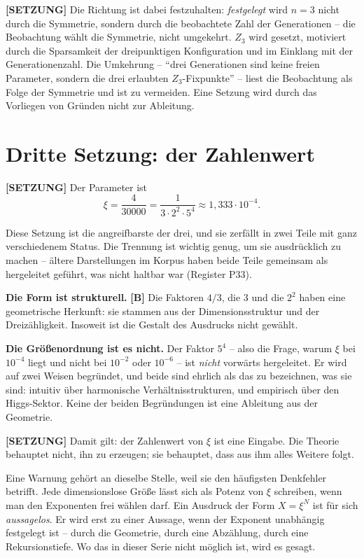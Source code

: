\textbf{[SETZUNG]} Die Richtung ist dabei festzuhalten: \emph{festgelegt} wird
$n=3$ nicht durch die Symmetrie, sondern durch die beobachtete Zahl der
Generationen -- die Beobachtung wählt die Symmetrie, nicht umgekehrt. $Z_3$ wird
gesetzt, motiviert durch die Sparsamkeit der dreipunktigen Konfiguration und im
Einklang mit der Generationenzahl. Die Umkehrung -- \enquote{drei Generationen
sind keine freien Parameter, sondern die drei erlaubten $Z_3$-Fixpunkte} -- liest
die Beobachtung als Folge der Symmetrie und ist zu vermeiden.
Eine Setzung wird durch das Vorliegen von Gründen nicht zur Ableitung.

\section{Dritte Setzung: der Zahlenwert}

\textbf{[SETZUNG]} Der Parameter ist
\[
  \xi = \frac{4}{30000} = \frac{1}{3\cdot 2^2\cdot 5^4}
  \approx 1{,}333\cdot 10^{-4}.
\]

Diese Setzung ist die angreifbarste der drei, und sie zerfällt in zwei Teile
mit ganz verschiedenem Status. Die Trennung ist wichtig genug, um sie
ausdrücklich zu machen -- ältere Darstellungen im Korpus haben beide Teile
gemeinsam als hergeleitet geführt, was nicht haltbar war (Register P33).

\textbf{Die Form ist strukturell.} \textbf{[B]} Die Faktoren $4/3$, die $3$ und
die $2^2$ haben eine geometrische Herkunft: sie stammen aus der
Dimensionsstruktur und der Dreizähligkeit. Insoweit ist die Gestalt des
Ausdrucks nicht gewählt.

\textbf{Die Größenordnung ist es nicht.} Der Faktor $5^4$ -- also die Frage,
warum $\xi$ bei $10^{-4}$ liegt und nicht bei $10^{-2}$ oder $10^{-6}$ --
ist \emph{nicht} vorwärts hergeleitet. Er wird auf zwei Weisen begründet, und
beide sind ehrlich als das zu bezeichnen, was sie sind: intuitiv über
harmonische Verhältnisstrukturen, und empirisch über den Higgs-Sektor. Keine
der beiden Begründungen ist eine Ableitung aus der Geometrie.

\textbf{[SETZUNG]} Damit gilt: der Zahlenwert von $\xi$ ist eine Eingabe. Die
Theorie behauptet nicht, ihn zu erzeugen; sie behauptet, dass aus ihm alles
Weitere folgt.

Eine Warnung gehört an dieselbe Stelle, weil sie den häufigsten Denkfehler
betrifft. Jede dimensionslose Größe lässt sich als Potenz von $\xi$ schreiben,
wenn man den Exponenten frei wählen darf. Ein Ausdruck der Form
$X = \xi^N$ ist für sich \emph{aussagelos}. Er wird erst zu einer Aussage,
wenn der Exponent unabhängig festgelegt ist -- durch die Geometrie, durch eine
Abzählung, durch eine Rekursionstiefe. Wo das in dieser Serie nicht möglich
ist, wird es gesagt.

